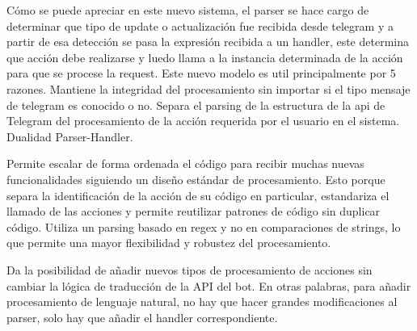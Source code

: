     \par Cómo se puede apreciar en este nuevo sistema, el parser se hace cargo de determinar que tipo de update o actualización fue recibida desde telegram y a partir de esa detección se pasa la expresión recibida a un handler, este determina que acción debe realizarse y luedo llama a la instancia determinada de la acción para que se procese la request. Este nuevo modelo es util principalmente por 5 razones.
    Mantiene la integridad del procesamiento sin importar si el tipo mensaje de telegram es conocido o no.
    Separa el parsing de la estructura de la api de Telegram del procesamiento de la acción requerida por el usuario en el sistema. Dualidad Parser-Handler.
    \par Permite escalar de forma ordenada el código para recibir muchas nuevas funcionalidades siguiendo un diseño estándar de procesamiento. Esto porque separa la identificación de la acción de su código en particular, estandariza el llamado de las acciones y permite reutilizar patrones de código sin duplicar código. 
    Utiliza un parsing basado en regex y no en comparaciones de strings, lo que permite una mayor flexibilidad y robustez del procesamiento.
    \par Da la posibilidad de añadir nuevos tipos de procesamiento de acciones sin cambiar la lógica  de traducción de la API del bot. En otras palabras, para añadir procesamiento de lenguaje natural, no hay que hacer grandes modificaciones al parser, solo hay que añadir el handler correspondiente.

